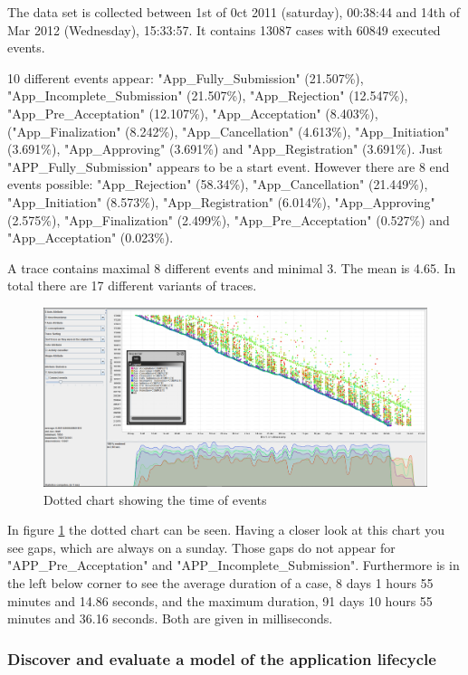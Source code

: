 The data set is collected between 1st of 0ct 2011 (saturday), 00:38:44 and 14th of Mar 2012 (Wednesday), 15:33:57. It contains 13087 cases with 60849 executed events.

10 different events appear: "App\_Fully\_Submission" (21.507\%), "App\_Incomplete\_Submission" (21.507\%), "App\_Rejection" (12.547\%), "App\_Pre\_Acceptation" (12.107\%), "App\_Acceptation" (8.403\%), ("App\_Finalization" (8.242\%), "App\_Cancellation" (4.613\%), "App\_Initiation" (3.691\%), "App\_Approving" (3.691\%) and "App\_Registration" (3.691\%). Just "APP\_Fully\_Submission" appears to be a start event. However there are 8 end events possible: "App\_Rejection" (58.34\%), "App\_Cancellation" (21.449\%), "App\_Initiation" (8.573\%), "App\_Registration" (6.014\%), "App\_Approving" (2.575\%), "App\_Finalization" (2.499\%), "App\_Pre\_Acceptation" (0.527\%) and "App\_Acceptation" (0.023\%).

A trace contains maximal 8 different events and minimal 3. The mean is 4.65. In total there are 17 different variants of traces. 


\begin{figure}[!htbp]
\centering
\includegraphics[height = 0.2\textheight]{AppData.PNG}
\caption{Dotted chart showing the time of events}
\label{fig:AppTimeFlow}
\end{figure}

In figure \ref{fig:AppTimeFlow} the dotted chart can be seen. Having a closer look at this chart you see gaps, which are always on a sunday. Those gaps do not appear for "APP\_Pre\_Acceptation" and "APP\_Incomplete\_Submission". Furthermore is in the left below corner to see the average duration of a case, 8 days 1 hours 55 minutes and 14.86 seconds, and the maximum duration, 91 days 10 hours 55 minutes and 36.16 seconds. Both are given in milliseconds.


\subsubsection{Discover and evaluate a model of the application lifecycle}

